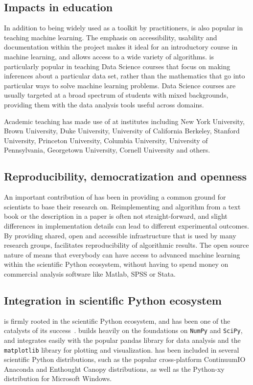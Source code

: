 \subsection{Impacts in education}
In addition to being widely used as a toolkit by practitioners,
\sklearn{} is also popular in teaching machine learning.
The emphasis on accessibility, usability and documentation within
the \sklearn{} project makes it ideal for an introductory
course in machine learning, and allows access to a wide variety
of algorithms. \sklearn{} is particularly popular in teaching
Data Science courses that focus on making inferences about
a particular data set, rather than the mathematics that go into
particular ways to solve machine learning problems.
Data Science courses are usually targeted at a broad spectrum
of students with mixed backgrounds, providing them
with the data analysis tools useful across domains.

Academic teaching has made use of \sklearn{} at institutes including New York
University, Brown University, Duke University, University of California
Berkeley, Stanford University, Princeton University, Columbia University,
University of Pennsylvania, Georgetown University, Cornell University and
others.

\subsection{Reproducibility, democratization and openness}
An important contribution of \sklearn{} has been in providing a common
ground for scientists to base their research on. Reimplementing
and algorithm from a text book or the description in a paper is often not
straight-forward, and slight differences in implementation details can
lead to different experimental outcomes. By providing shared, open and 
accessible infrastructure that is used by many research groups,
\sklearn{} facilitates reproducibility of algorithmic results.
The open source nature of \sklearn{} means that everybody can have access
to advanced machine learning within the scientific Python ecosystem,
without having to spend money on commercial analysis software like Matlab,
SPSS or Stata.

\subsection{Integration in scientific Python ecosystem}
\sklearn{} is firmly rooted in the scientific Python ecosystem, and has been
one of the catalysts of its success~\textcite{benlorica, infoworld}. \sklearn{}
builds heavily on the foundations on \texttt{NumPy} and \texttt{SciPy}, and
integrates easily with the popular pandas library for data analysis and the
\texttt{matplotlib} library for plotting and visualization.
\sklearn{} has been included in several scientific Python distributions, such
as the popular cross-platform ContinuumIO Anaconda and Enthought Canopy
distributions, as well as the Python-xy distribution for Microsoft Windows.

